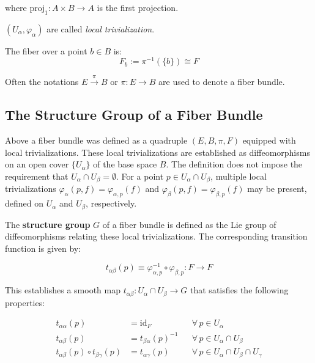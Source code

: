 \begin{center}
\end{center}


where $\text{proj}_1: A \times B \to A$ is the first projection.

$(U_\alpha, \varphi_\alpha)$ are called \emph{local trivialization}.

The fiber over a point $b \in B$ is:
\[
F_b := \pi^{-1}(\{b\}) \cong F
\]

Often the notations $E \xrightarrow{\pi} B$ or $\pi : E \to B$ are used to denote a fiber bundle.


\subsection{The Structure Group of a Fiber Bundle}

Above a fiber bundle was defined as a quadruple \((E, B, \pi, F)\) equipped with local trivializations. These local trivializations are established as diffeomorphisms on an open cover $\{U_\alpha\}$ of the base space \(B\). The definition does not impose the requirement that \(U_\alpha \cap U_\beta = \emptyset\). For a point \(p \in U_\alpha \cap U_\beta\), multiple local trivializations \(\varphi_\alpha(p, f) = \varphi_{\alpha,p}(f)\) and \(\varphi_\beta(p, f) = \varphi_{\beta,p}(f)\) may be present, defined on \(U_\alpha\) and \(U_\beta\), respectively.

The \textbf{structure group} \(G\) of a fiber bundle is defined as the Lie group of diffeomorphisms relating these local trivializations. The corresponding transition function is given by\cite{NakaharaGeometrytopologyphysics2005}:

\[
t_{\alpha\beta}(p) \equiv \varphi_{\alpha,p}^{-1} \circ \varphi_{\beta,p} : F \to F
\]

This establishes a smooth map \(t_{\alpha\beta}: U_\alpha \cap U_\beta \to G\) that satisfies the following properties:

\begin{align*}
  t_{\alpha \alpha}(p) &= \mathrm{id}_F && \forall\, p \in U_\alpha \\
  t_{\alpha\beta}(p) &= t_{\beta\alpha}(p)^{-1} && \forall\, p \in U_\alpha \cap U_\beta \\
  t_{\alpha\beta}(p) \circ t_{\beta\gamma}(p) &= t_{\alpha\gamma}(p) && \forall\, p \in U_\alpha \cap U_\beta \cap U_\gamma
\end{align*}


